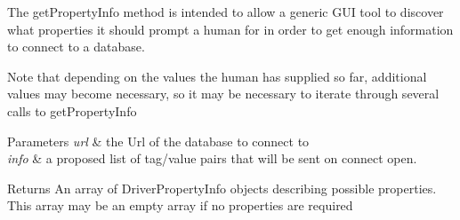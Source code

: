 The get\+Property\+Info method is intended to allow a generic G\+UI tool to discover what properties it should prompt a human for in order to get enough information to connect to a database.

Note that depending on the values the human has supplied so far, additional values may become necessary, so it may be necessary to iterate through several calls to get\+Property\+Info 


\begin{DoxyParams}{Parameters}
{\em url} & the Url of the database to connect to \\
\hline
{\em info} & a proposed list of tag/value pairs that will be sent on connect open.\\
\hline
\end{DoxyParams}
\begin{DoxyReturn}{Returns}
An array of Driver\+Property\+Info objects describing possible properties. This array may be an empty array if no properties are required
\end{DoxyReturn}

